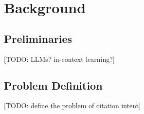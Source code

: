 \section{Background}
\label{sec:background}


\subsection{Preliminaries}

{\color{red}[TODO: LLMs? in-context learning?]}

\subsection{Problem Definition}

{\color{red}[TODO: define the problem of citation intent]}
